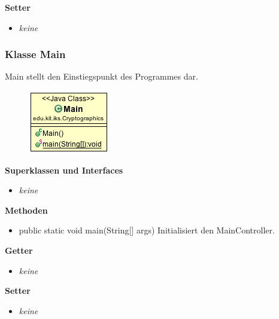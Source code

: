 \documentclass{article}
\begin{document}
      \textbf{Setter}
      \begin{itemize}
        \item \textit{keine}
      \end{itemize}

    \subsubsection{Klasse Main}
      Main stellt den Einstiegspunkt des Programmes dar.
      \begin{figure}[H]
        \centering
        \includegraphics{resources/edu-kit-iks-Cryptographics-Main}
      \end{figure}

      \textbf{Superklassen und Interfaces}
      \begin{itemize}
        \item \textit{keine}
      \end{itemize}
      
      \textbf{Methoden}
      \begin{itemize}
        \item public static void main(String[] args) \newline
        Initialisiert den MainController.
      \end{itemize}

      \textbf{Getter}
      \begin{itemize}
        \item \textit{keine}
      \end{itemize}

      \textbf{Setter}
      \begin{itemize}
        \item \textit{keine}
      \end{itemize}
\end{document}
